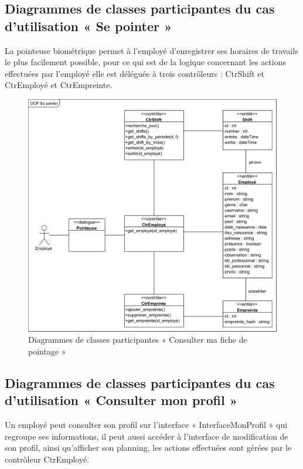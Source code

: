 \begin{itemize}
        \subsection*{Diagrammes de classes participantes du cas d'utilisation « Se pointer »}
        La pointeuse biométrique permet à l’employé d’enregistrer ses horaires de travails le plus facilement possible, pour ce qui est de la logique concernant les actions effectuées par l’employé elle est déléguée à trois contrôleurs : CtrShift et CtrEmployé et CtrEmpreinte.
            \vspace{-20pt}
            \begin{figure}[h!]
                 \centering
                \includegraphics[scale=0.84]{images/DCP/DCP Se pointer.png}
                 \caption{Diagrammes de classes participantes « Consulter ma fiche de pointage »}
                 \label{fig24}
            \end{figure}
            
        \subsection*{Diagrammes de classes participantes du cas d'utilisation « Consulter mon profil »}
            Un employé peut consulter son profil sur l’interface « InterfaceMonProfil » qui regroupe ses informations, il peut aussi accéder à l’interface de modification de son profil, ainsi qu’afficher son planning, les actions effectuées sont gérées par le contrôleur CtrEmployé.  


\end{itemize}
